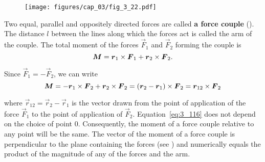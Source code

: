 \begin{figure}[t]
	\begin{center}
		\texttt{[image: figures/cap\_03/fig\_3\_22.pdf]}
		\caption[]{}
		\label{fig:3_22}
	\end{center}
	\vspace{-0.75cm}
\end{figure}

Two equal, parallel and oppositely directed forces are called \textbf{a force couple} (). The distance $l$ between the lines along which the forces act is called the arm of the couple. The total moment of the forces $\vec{F}_1$ and $\vec{F}_2$ forming the couple is
\begin{equation*}
\boldsymbol{M} = \boldsymbol{r}_{1}\times\boldsymbol{F}_{1} + \boldsymbol{r}_{2}\times\boldsymbol{F}_{2}.
\end{equation*}

\noindent
Since $\vec{F}_1=-\vec{F}_2$, we can write
\begin{equation}\label{eq:3_116}
\boldsymbol{M} = -\boldsymbol{r}_{1}\times\boldsymbol{F}_{2} + \boldsymbol{r}_{2}\times\boldsymbol{F}_{2} = (\boldsymbol{r}_2 - \boldsymbol{r}_1)\times\boldsymbol{F}_2 = \boldsymbol{r}_{12}\times\boldsymbol{F}_{2}
\end{equation}

\noindent
where $\vec{r}_{12}=\vec{r}_2-\vec{r}_1$ is the vector drawn from the point of application of the force $\vec{F}_1$ to the point of application of $\vec{F}_2$. Equation~\eqref{eq:3_116} does not depend on the choice of point $0$. Consequently, the moment of a force couple relative to any point will be the same. The vector of the moment of a force couple is perpendicular to the plane containing the forces (see ) and numerically equals the product of the magnitude of any of the forces and the arm.


